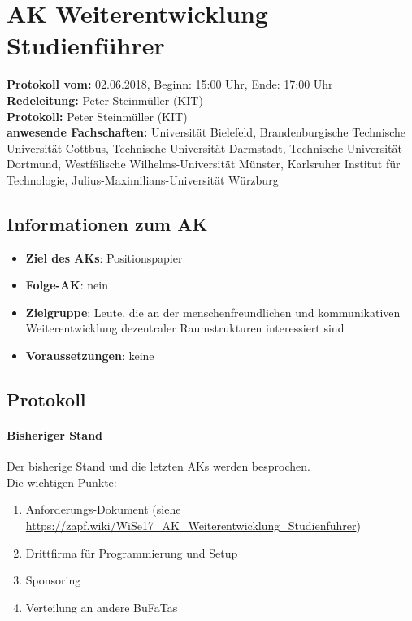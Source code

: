 
\section{AK Weiterentwicklung Studienführer}

  \textbf{Protokoll vom:} 02.06.2018, %
  Beginn: 15:00 Uhr,
  Ende: 17:00 Uhr \\
  \textbf{Redeleitung:} Peter Steinmüller (KIT) \\
  \textbf{Protokoll:} Peter Steinmüller (KIT) \\
  \textbf{anwesende Fachschaften:} Universität Bielefeld, Brandenburgische Technische Universität Cottbus, Technische Universität Darmstadt, Technische Universität Dortmund, Westfälische Wilhelms-Universität Münster, Karlsruher Institut für Technologie, Julius-Maximilians-Universität Würzburg

  \subsection*{Informationen zum AK}
    \begin{itemize}
      \item \textbf{Ziel des AKs}: Positionspapier
      \item \textbf{Folge-AK}: nein
      \item \textbf{Zielgruppe}: Leute, die an der menschenfreundlichen und kommunikativen Weiterentwicklung dezentraler Raumstrukturen interessiert sind
      \item \textbf{Voraussetzungen}: keine
    \end{itemize}

  \subsection*{Protokoll}
    \paragraph{Bisheriger Stand}
      Der bisherige Stand und die letzten AKs werden besprochen. \\

      Die wichtigen Punkte:
      \begin{enumerate}
        \item Anforderungs-Dokument (siehe \url{https://zapf.wiki/WiSe17_AK_Weiterentwicklung_Studienführer})
        \item Drittfirma für Programmierung und Setup
        \item Sponsoring
        \item Verteilung an andere BuFaTas
      \end{enumerate}

